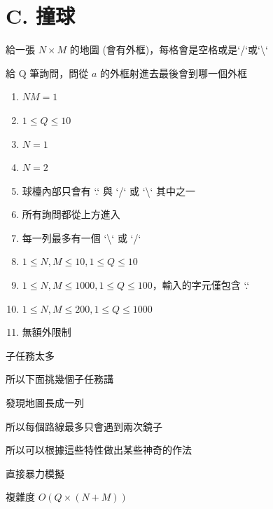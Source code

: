 \section{C. 撞球}

\begin{frame}{}
    給一張 $N \times M$ 的地圖 (會有外框)，每格會是空格或是`/`或`\textbackslash`

    給 Q 筆詢問，問從 $a$ 的外框射進去最後會到哪一個外框
\end{frame}

\begin{frame}{}
    \begin{enumerate}
        \item{$NM = 1$}
        \item{$1 \le Q \le 10$}
        \item{$N = 1$}
        \item{$N = 2$}
        \item{球檯內部只會有 `.` 與 `/` 或 `\textbackslash` 其中之一}
        \item{所有詢問都從上方進入}
        \item{每一列最多有一個 `\textbackslash` 或 `/`}
        \item{$1 \le N, M \le 10, 1 \le Q \le 10$}
        \item{$1 \le N, M \le 1000, 1 \le Q \le 100$，輸入的字元僅包含 `.`}
        \item{$1 \le N, M \le 200, 1 \le Q \le 1000$}
        \item{無額外限制}
    \end{enumerate}
\end{frame}

\begin{frame}{}
    子任務太多

    所以下面挑幾個子任務講
\end{frame}

\begin{frame}{}
    發現地圖長成一列

    所以每個路線最多只會遇到兩次鏡子

    所以可以根據這些特性做出某些神奇的作法
\end{frame}

\begin{frame}{}
    直接暴力模擬

    複雜度 $O(Q \times (N+M))$
\end{frame}

